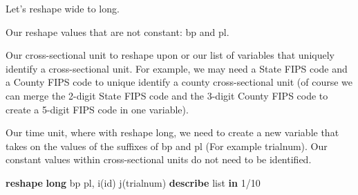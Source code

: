 \documentclass[
]{book}
\newenvironment{Shaded}{\begin{snugshade}}{\end{snugshade}}
\newcommand{\KeywordTok}[1]{\textcolor[rgb]{0.13,0.29,0.53}{\textbf{#1}}}
\newcommand{\NormalTok}[1]{#1}
\newcommand{\OtherTok}[1]{\textcolor[rgb]{0.56,0.35,0.01}{#1}}
\begin{document}
Let's reshape wide to long.

Our reshape values that are not constant: bp and pl.

Our cross-sectional unit to reshape upon or our list of variables that uniquely identify a cross-sectional unit. For example, we may need a State FIPS code and a County FIPS code to unique identify a county
cross-sectional unit (of course we can merge the 2-digit State FIPS code and the 3-digit County FIPS code to create a 5-digit FIPS code in one variable).

Our time unit, where with reshape long, we need to create a new variable that takes on the values of the suffixes of bp and pl (For example trialnum). Our constant values within cross-sectional units do not need to be identified.

\begin{Shaded}
\begin{Highlighting}[]
\KeywordTok{reshape} \KeywordTok{long}\NormalTok{ bp pl, i(id) j(trialnum)}
\KeywordTok{describe}
\OtherTok{list} \KeywordTok{in}\NormalTok{ 1/10}
\end{Highlighting}
\end{Shaded}
\end{document}
